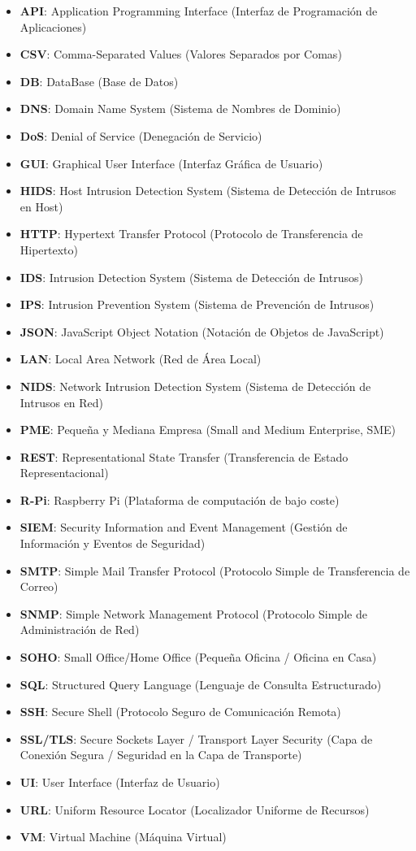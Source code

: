 \documentclass[11pt,a4paper,twoside]{report}
\begin{document}
\begin{itemize}
	\item \textbf{API}: Application Programming Interface (Interfaz de Programación de Aplicaciones)
	\item \textbf{CSV}: Comma-Separated Values (Valores Separados por Comas)
	\item \textbf{DB}: DataBase (Base de Datos)
	\item \textbf{DNS}: Domain Name System (Sistema de Nombres de Dominio)
	\item \textbf{DoS}: Denial of Service (Denegación de Servicio)
	\item \textbf{GUI}: Graphical User Interface (Interfaz Gráfica de Usuario)
	\item \textbf{HIDS}: Host Intrusion Detection System (Sistema de Detección de Intrusos en Host)
	\item \textbf{HTTP}: Hypertext Transfer Protocol (Protocolo de Transferencia de Hipertexto)
	\item \textbf{IDS}: Intrusion Detection System (Sistema de Detección de Intrusos)
	\item \textbf{IPS}: Intrusion Prevention System (Sistema de Prevención de Intrusos)
	\item \textbf{JSON}: JavaScript Object Notation (Notación de Objetos de JavaScript)
	\item \textbf{LAN}: Local Area Network (Red de Área Local)
	\item \textbf{NIDS}: Network Intrusion Detection System (Sistema de Detección de Intrusos en Red)
	\item \textbf{PME}: Pequeña y Mediana Empresa (Small and Medium Enterprise, SME)
	\item \textbf{REST}: Representational State Transfer (Transferencia de Estado Representacional)
	\item \textbf{R-Pi}: Raspberry Pi (Plataforma de computación de bajo coste)
	\item \textbf{SIEM}: Security Information and Event Management (Gestión de Información y Eventos de Seguridad)
	\item \textbf{SMTP}: Simple Mail Transfer Protocol (Protocolo Simple de Transferencia de Correo)
	\item \textbf{SNMP}: Simple Network Management Protocol (Protocolo Simple de Administración de Red)
	\item \textbf{SOHO}: Small Office/Home Office (Pequeña Oficina / Oficina en Casa)
	\item \textbf{SQL}: Structured Query Language (Lenguaje de Consulta Estructurado)
	\item \textbf{SSH}: Secure Shell (Protocolo Seguro de Comunicación Remota)
	\item \textbf{SSL/TLS}: Secure Sockets Layer / Transport Layer Security (Capa de Conexión Segura / Seguridad en la Capa de Transporte)
	\item \textbf{UI}: User Interface (Interfaz de Usuario)
	\item \textbf{URL}: Uniform Resource Locator (Localizador Uniforme de Recursos)
	\item \textbf{VM}: Virtual Machine (Máquina Virtual)
\end{itemize}
\end{document}
